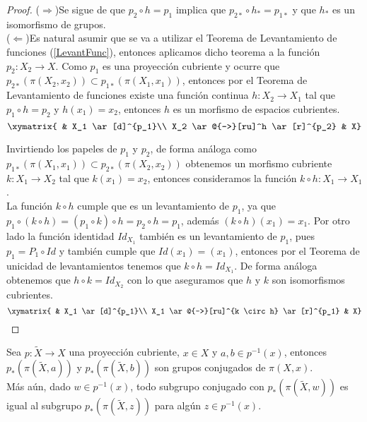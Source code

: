 \begin{proof}
($\Rightarrow$)Se sigue de que $p_2 \circ h = p_1$ implica que $p_{2*} \circ h_* = p_{1*}$ y que $h_*$ es un isomorfismo de grupos.\\

($\Leftarrow$)Es natural asumir que se va a utilizar el Teorema de Levantamiento de funciones (\ref{LevantFunc}), entonces aplicamos dicho teorema a la funci\'on $p_2: X_2 \rightarrow X$. Como $p_1$ es una proyecci\'on cubriente y ocurre que $p_{2*}(\pi(X_2,x_2)) \subset p_{1*}(\pi (X_1,x_1))$, entonces por el Teorema de Levantamiento de funciones existe una funci\'on continua $h: X_2 \rightarrow X_1$ tal que $p_1 \circ h= p_2$ y $h(x_1)=x_2$, entonces $h$ es un morfismo de espacios cubrientes.\\


$$ \xymatrix{    & X_1 \ar[d]^{p_1}\\
              X_2 \ar@{-->}[ru]^h \ar[r]^{p_2} & X} $$


Invirtiendo los papeles de $p_1$ y $p_2$, de forma an\'aloga como $p_{1*}(\pi (X_1,x_1)) \subset p_{2*}(\pi(X_2,x_2))$ obtenemos un morfismo cubriente $k: X_1 \rightarrow X_2$ tal que $k(x_1)=x_2$, entonces consideramos la funci\'on $k \circ h: X_1 \rightarrow X_1$.\\
La funci\'on $k \circ h$ cumple que es un levantamiento de $p_1$, ya que $p_1 \circ (k \circ h)= (p_1 \circ k) \circ h = p_2 \circ h = p_1$, adem\'as $(k \circ h)(x_1)=x_1$. Por otro lado la funci\'on identidad $Id_{X_1}$ tambi\'en es un levantamiento de $p_1$, pues $p_1= P_1 \circ Id$ y tambi\'en cumple que $Id(x_1)=(x_1)$, entonces por el Teorema de unicidad de levantamientos tenemos que $k\circ h= Id_{X_1}$. De forma an\'aloga obtenemos que $h \circ k = Id_{X_2}$ con lo que aseguramos que $h$ y $k$ son isomorfismos cubrientes.\\ 

$$ \xymatrix{    & X_1 \ar[d]^{p_1}\\
              X_1 \ar@{-->}[ru]^{k \circ h} \ar[r]^{p_1} & X} $$


\end{proof}

\begin{proposition}\label{Conj}

Sea $p:\widetilde{X} \rightarrow X$ una proyecci\'on cubriente, $x \in X$ y $a,b \in p^{-1}(x)$, entonces $p_*(\pi(\widetilde{X},a))$ y $p_*(\pi(\widetilde{X},b))$ son grupos conjugados de $\pi(X,x)$.\\

M\'as a\'un, dado $w \in p^{-1}(x)$, todo subgrupo conjugado con $p_*(\pi(\widetilde{X},w))$ es igual al subgrupo $p_*(\pi(\widetilde{X},z))$ para alg\'un $z \in p^{-1}(x)$.

\end{proposition}

